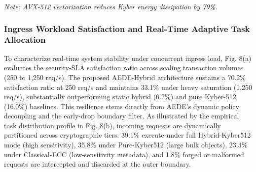 \documentclass[5p,times]{elsarticle}
\begin{document}
\begin{table}[!ht]
  \centering
  \caption{Energy Consumption, Memory RSS Footprint, and Instruction Count Microbenchmarks}
  \vspace{2pt}
  \par\raggedright\footnotesize\textit{\textit{Note:} AVX-512 vectorization reduces Kyber energy dissipation by 79\%.}
\end{table}


\subsubsection{Ingress Workload Satisfaction and Real-Time Adaptive Task Allocation}

To characterize real-time system stability under concurrent ingress load, Fig. 8(a) evaluates the security-SLA satisfaction ratio across scaling transaction volumes (250 to 1,250 req/s). The proposed AEDE-Hybrid architecture sustains a 70.2\% satisfaction ratio at 250 req/s and maintains 33.1\% under heavy saturation (1,250 req/s), substantially outperforming static hybrid (6.2\%) and pure Kyber-512 (16.0\%) baselines. This resilience stems directly from AEDE's dynamic policy decoupling and the early-drop boundary filter. As illustrated by the empirical task distribution profile in Fig. 8(b), incoming requests are dynamically partitioned across cryptographic tiers: 39.1\% execute under full Hybrid-Kyber512 mode (high sensitivity), 35.8\% under Pure-Kyber512 (large bulk objects), 23.3\% under Classical-ECC (low-sensitivity metadata), and 1.8\% forged or malformed requests are intercepted and discarded at the outer boundary.
\end{document}
